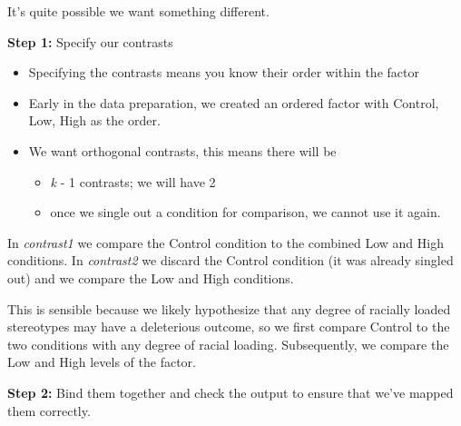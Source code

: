 \documentclass[
  english,
]{book}
\newenvironment{Shaded}{\begin{snugshade}}{\end{snugshade}}
\newcommand{\CommentTok}[1]{\textcolor[rgb]{0.56,0.35,0.01}{\textit{#1}}}
\newcommand{\DecValTok}[1]{\textcolor[rgb]{0.00,0.00,0.81}{#1}}
\newcommand{\FunctionTok}[1]{\textcolor[rgb]{0.00,0.00,0.00}{#1}}
\newcommand{\NormalTok}[1]{#1}
\newcommand{\OtherTok}[1]{\textcolor[rgb]{0.56,0.35,0.01}{#1}}
\newcommand{\SpecialCharTok}[1]{\textcolor[rgb]{0.00,0.00,0.00}{#1}}
\providecommand{\tightlist}{%
  \setlength{\itemsep}{0pt}\setlength{\parskip}{0pt}}
\begin{document}
It's quite possible we want something different.

\textbf{Step 1: } Specify our contrasts

\begin{itemize}
\tightlist
\item
  Specifying the contrasts means you know their order within the factor
\item
  Early in the data preparation, we created an ordered factor with Control, Low, High as the order.
\item
  We want orthogonal contrasts, this means there will be

  \begin{itemize}
  \tightlist
  \item
    \emph{k} - 1 contrasts; we will have 2
  \item
    once we single out a condition for comparison, we cannot use it again.
  \end{itemize}
\end{itemize}

In \emph{contrast1} we compare the Control condition to the combined Low and High conditions.
In \emph{contrast2} we discard the Control condition (it was already singled out) and we compare the Low and High conditions.

This is sensible because we likely hypothesize that any degree of racially loaded stereotypes may have a deleterious outcome, so we first compare Control to the two conditions with any degree of racial loading. Subsequently, we compare the Low and High levels of the factor.

\textbf{Step 2:} Bind them together and check the output to ensure that we've mapped them correctly.

\begin{Shaded}
\end{Shaded}
\end{document}
